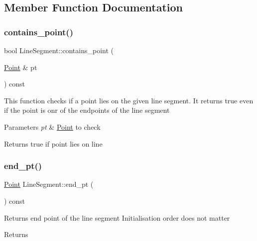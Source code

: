 \subsection{Member Function Documentation}
\mbox{\label{classLineSegment_a1b18c795d8c3c6f2724074062967671e}} 
\subsubsection{\texorpdfstring{contains\+\_\+point()}{contains\_point()}}
{\footnotesize\ttfamily bool Line\+Segment\+::contains\+\_\+point (\begin{DoxyParamCaption}\item[{\hyperlink{classPoint}{Point} \&}]{pt }\end{DoxyParamCaption}) const}

This function checks if a point lies on the given line segment. It returns true even if the point is onr of the endpoints of the line segment 
\begin{DoxyParams}{Parameters}
{\em pt} & \hyperlink{classPoint}{Point} to check \\
\hline
\end{DoxyParams}
\begin{DoxyReturn}{Returns}
true if point lies on line 
\end{DoxyReturn}
\mbox{\label{classLineSegment_aa6c90340de500bb72bdde2114f838d57}} 
\subsubsection{\texorpdfstring{end\+\_\+pt()}{end\_pt()}}
{\footnotesize\ttfamily \hyperlink{classPoint}{Point} Line\+Segment\+::end\+\_\+pt (\begin{DoxyParamCaption}{ }\end{DoxyParamCaption}) const}

Returns end point of the line segment Initialisation order does not matter \begin{DoxyReturn}{Returns}

\end{DoxyReturn}
\mbox{\label{classLineSegment_a51a9d2fcca6b3ff03cb51fd4d8fae4ba}} 
